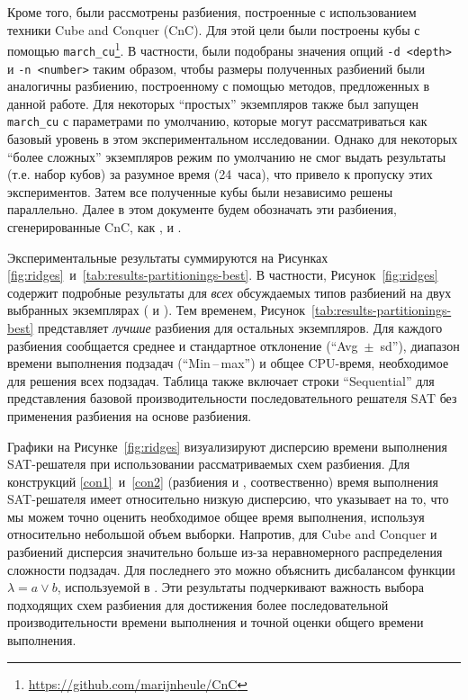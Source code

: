 Кроме того, были рассмотрены разбиения, построенные с использованием техники Cube and Conquer (CnC).
Для этой цели были построены кубы с помощью \texttt{march\_cu}\footnote{\url{https://github.com/marijnheule/CnC}}.
В частности, были подобраны значения опций \texttt{-d <depth>} и \texttt{-n <number>} таким образом, чтобы размеры полученных разбиений были аналогичны разбиению, построенному с помощью методов, предложенных в данной работе.
Для некоторых \enquote{простых} экземпляров также был запущен \texttt{march\_cu} с параметрами по умолчанию, которые могут рассматриваться как базовый уровень в этом экспериментальном исследовании.
Однако для некоторых \enquote{более сложных} экземпляров режим по умолчанию не смог выдать результаты (т.е. набор кубов) за разумное время (24~часа), что привело к пропуску этих экспериментов.
Затем все полученные кубы были независимо решены параллельно.
Далее в этом документе будем обозначать эти разбиения, сгенерированные CnC, как ,  и .

Экспериментальные результаты суммируются на Рисунках \ref{fig:ridges}~и~\ref{tab:results-partitionings-best}.
В частности, Рисунок~\ref{fig:ridges} содержит
подробные результаты для \textit{всех} обсуждаемых типов разбиений на двух выбранных экземплярах ( и ).
Тем временем, Рисунок~\ref{tab:results-partitionings-best} представляет \emph{лучшие} разбиения для остальных экземпляров.
Для каждого разбиения сообщается среднее и стандартное отклонение (\enquote{Avg~$\pm$~sd}), диапазон времени выполнения подзадач (\enquote{Min\,--\,max}) и общее CPU-время, необходимое для решения всех подзадач.
Таблица также включает строки \enquote{Sequential} для представления базовой производительности последовательного решателя SAT без применения разбиения на основе разбиения.

Графики на Рисунке~\ref{fig:ridges} визуализируют дисперсию времени выполнения SAT-решателя при использовании рассматриваемых схем разбиения.
Для конструкций \ref{con1}~и~\ref{con2} (разбиения  и , соотвественно) время выполнения SAT-решателя имеет относительно низкую дисперсию, что указывает на то, что мы можем точно оценить необходимое общее время выполнения, используя относительно небольшой объем выборки.
Напротив, для Cube and Conquer и разбиений  дисперсия значительно больше из-за неравномерного распределения сложности подзадач.
Для последнего это можно объяснить дисбалансом функции $\lambda = a \lor b$, используемой в .
Эти результаты подчеркивают важность выбора подходящих схем разбиения для достижения более последовательной производительности времени выполнения и точной оценки общего времени выполнения.

